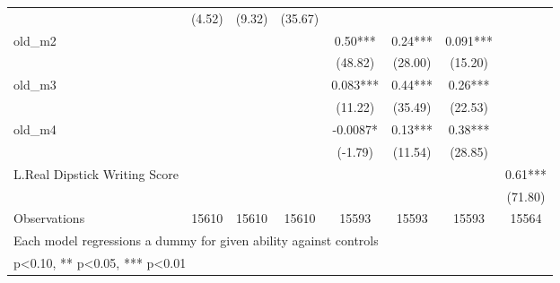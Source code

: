 \begin{table}[htbp]
\begin{tabular}{l*{7}{c}}
                &   (4.52)   &   (9.32)   &  (35.67)   &            &            &            &            \\
old\_m2          &            &            &            &     0.50***&     0.24***&    0.091***&            \\
                &            &            &            &  (48.82)   &  (28.00)   &  (15.20)   &            \\
old\_m3          &            &            &            &    0.083***&     0.44***&     0.26***&            \\
                &            &            &            &  (11.22)   &  (35.49)   &  (22.53)   &            \\
old\_m4          &            &            &            &  -0.0087*  &     0.13***&     0.38***&            \\
                &            &            &            &  (-1.79)   &  (11.54)   &  (28.85)   &            \\
L.Real Dipstick Writing Score&            &            &            &            &            &            &     0.61***\\
                &            &            &            &            &            &            &  (71.80)   \\
\midrule
Observations    &    15610   &    15610   &    15610   &    15593   &    15593   &    15593   &    15564   \\
\bottomrule
\multicolumn{8}{l}{\footnotesize Each model regressions a dummy for given ability against controls}\\
\multicolumn{8}{l}{\footnotesize * p<0.10, ** p<0.05, *** p<0.01}\\
\end{tabular}
\end{table}
